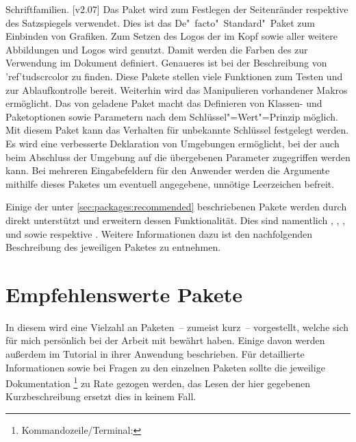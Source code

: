 \begin{DeclarePackages}
  Schriftfamilien.
  [v2.07]
  Das Paket wird zum Festlegen der Seitenränder respektive des Satzspiegels 
  verwendet.
  Dies ist das De"~facto"~Standard"~Paket zum Einbinden von Grafiken. Zum 
  Setzen des Logos der \TnUD im Kopf sowie aller weitere Abbildungen und Logos 
  wird  genutzt.
  Damit werden die Farben des \CDs zur Verwendung im Dokument definiert. 
  Genaueres ist bei der Beschreibung von \Package'ref'{tudscrcolor} zu finden. 
  Diese Pakete stellen viele Funktionen zum Testen und zur Ablaufkontrolle 
  bereit. Weiterhin wird das Manipulieren vorhandener Makros ermöglicht.
  Das von  geladene Paket  macht das 
  Definieren von Klassen- und Paketoptionen sowie Parametern nach dem 
  Schlüssel"=Wert"=Prinzip möglich. Mit diesem Paket kann das Verhalten für 
  unbekannte Schlüssel festgelegt werden.
  Es wird eine verbesserte Deklaration von Umgebungen ermöglicht, bei der auch 
  beim Abschluss der Umgebung auf die übergebenen Parameter zugegriffen werden 
  kann. 
  Bei mehreren Eingabefeldern für den Anwender werden die Argumente mithilfe 
  dieses Paketes um eventuell angegebene, unnötige Leerzeichen befreit.
\end{DeclarePackages}



%
Einige der unter \autoref{sec:packages:recommended} beschriebenen Pakete werden 
durch \TUDScript direkt unterstützt und erweitern dessen Funktionalität. Dies
sind namentlich , , , 
 und  sowie  respektive 
. Weitere Informationen dazu ist den nachfolgenden 
Beschreibung des jeweiligen Paketes zu entnehmen.



\section{%
  Empfehlenswerte Pakete%
  \label{sec:packages:recommended}%
}
%
In diesem \autorefname wird eine Vielzahl an Paketen~-- zumeist kurz~-- 
vorgestellt, welche sich für mich persönlich bei der Arbeit mit  
bewährt haben. Einige davon werden außerdem im Tutorial  in 
ihrer Anwendung beschrieben. Für detaillierte Informationen sowie bei Fragen zu 
den einzelnen Paketen sollte die jeweilige Dokumentation%
\footnote{Kommandozeile/Terminal: }
zu Rate gezogen werden, das Lesen der hier gegebenen Kurzbeschreibung ersetzt 
dies in keinem Fall.
%
\NewExpandableDocumentCommand{}



